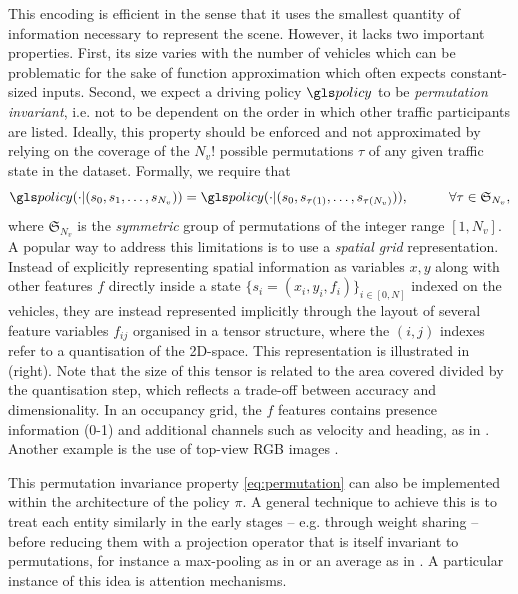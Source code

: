 This encoding is efficient in the sense that it uses the smallest quantity of information necessary to represent the scene. However, it lacks two important properties. First, its size varies with the number of vehicles which can be problematic for the sake of function approximation which often expects constant-sized inputs. Second, we expect a driving policy $\policy$ to be \emph{permutation invariant}, i.e. not to be dependent on the order in which other traffic participants are listed. Ideally, this property should be enforced and not approximated by relying on the coverage of the $N_v!$ possible permutations $\tau$ of any given traffic state in the dataset. Formally, we require that
\begin{equation}
\label{eq:permutation}
\policy(\cdot|(s_0, s_1,\dotsc,s_{N_v})) = \policy(\cdot|(s_0, s_{\tau(1)},\dotsc,s_{\tau(N_v)})), \quad\quad\quad \forall\tau \in \mathfrak{S}_{N_v},
\end{equation}
where $\mathfrak{S}_{N_v}$ is the \emph{symmetric} group of permutations of the integer range $[1,N_v]$.
A popular way to address this limitations is to use a \emph{spatial grid} representation. Instead of explicitly representing spatial information as variables $x, y$ along with other features $f$ directly inside a state $\{s_i=(x_i,y_i,f_i)\}_{i\in[0,N]}$ indexed on the vehicles, they are instead represented implicitly through the layout of several feature variables $f_{ij}$ organised in a tensor structure, where the $(i,j)$ indexes refer to a quantisation of the 2D-space. This representation is illustrated in  (right). Note that the size of this tensor is related to the area covered divided by the quantisation step, which reflects a trade-off between accuracy and dimensionality.
In an occupancy grid, the $f$ features contains presence information (0-1) and additional channels such as velocity and heading, as in \citep[e.g.][]{Isele2018, Fridman2018, Bansal2018, Rehder2017c}. Another example is the use of top-view RGB images \citep[e.g.][]{Bagnell2010, Rehder2017, Rehder2017c, Liu2018}.


This permutation invariance property \eqref{eq:permutation} can also be implemented within the architecture of the policy $\pi$. A general technique to achieve this is to treat each entity similarly in the early stages -- e.g. through weight sharing -- before reducing them with a projection operator that is itself invariant to permutations, for instance a max-pooling as in \citep{Chen2017,Hoel2018} or an average as in \citep{Qi2016}. A particular instance of this idea is attention mechanisms.


